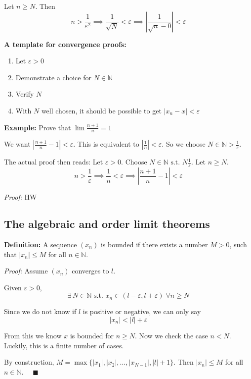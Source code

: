 \documentclass[12pt]{report}
\newcommand{\N}{\mathbb{N}}
\newcommand{\qed}{\quad \blacksquare}
\newcommand{\abs}[1]{\left\vert #1 \right\vert}
\newcommand{\st}{\text{ s.t. }}
\newenvironment*{tbox}[2][gray]{
    \begin{tcolorbox}[
        parbox=false,
        colback=#1!5!white,
        colframe=#1!75!black,
        breakable,
        title={#2}
    ]}
    {\end{tcolorbox}}
\begin{document}
        Let $n \geq N$. Then 
        \[n > \frac{1}{\varepsilon^2} \implies \frac{1}{\sqrt{N}} < \varepsilon \implies \abs{\frac{1}{\sqrt{n} - 0}} < \varepsilon\]

        \textbf{A template for convergence proofs:}
            \begin{enumerate}
                \item Let $\varepsilon > 0$
                \item Demonstrate a choice for $N \in \N$
                \item Verify $N$
                \item With $N$ well chosen, it should be possible to get $\abs{x_n- x} < \varepsilon$ 
            \end{enumerate}

        \textbf{Example:} Prove that $\lim \frac{n+1}{n} = 1$ 

        We want $\abs{\frac{n+1}{n} - 1} < \varepsilon$. This is equivalent to $\abs{\frac{1}{n}} < \varepsilon$. So we choose $N \in \N > \frac{1}{\varepsilon}$. 

        The actual proof then reads: Let $\varepsilon > 0$. Choose $N \in \N \st N \frac{1}{\varepsilon}$. Let $n \geq N$. 
        \[n > \frac{1}{\varepsilon} \implies \frac{1}{n} < \varepsilon \implies \abs{\frac{n+1}{n} - 1} < \varepsilon\]

        \begin{tbox}{\textbf{Theorem (Uniqueness of limits):} The limit of a sequence, when it exists, is unique}
            \emph{Proof:} HW         
        \end{tbox}

    \subsection*{The algebraic and order limit theorems}
        \textbf{Definition:} A sequence $(x_n)$ is bounded if there exists a number $M > 0$, such that $\abs{x_n} \leq M$ for all $n \in \N$. 

        \begin{tbox}{\textbf{Theorem:} Every convergent sequence is bounded}
            \emph{Proof:} Assume $(x_n)$ converges to $l$. 

            Given $\varepsilon > 0$, 
            \[\exists\, N \in \N \st x_n \in (l - \varepsilon, l + \varepsilon) \; \forall n \geq N\]

            Since we do not know if $l$ is positive or negative, we can only say 
            \[\abs{x_n} < \abs{l} + \varepsilon\] 

            From this we know $x$ is bounded for $n \geq N$. Now we check the case $n < N$. Luckily, this is a finite number of cases. 

            By construction, $M = \max\{\abs{x_1}, \abs{x_2}, \dots, \abs{x_{N-1}}, \abs{l} + 1\}$. Then $\abs{x_n} \leq M$ for all $n \in \N$. $\qed$   
        \end{tbox}
\end{document}
